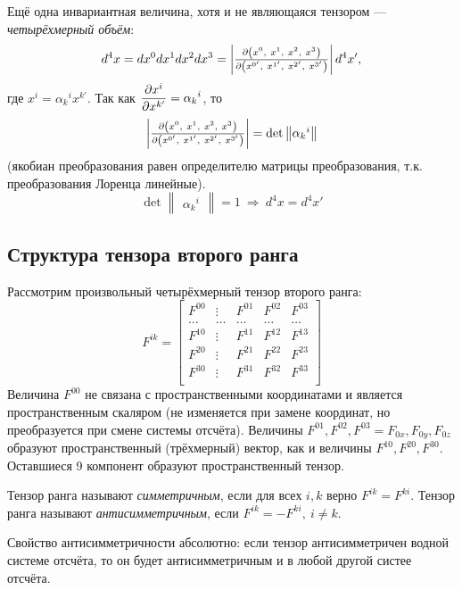     Ещё одна инвариантная величина, хотя и не являющаяся тензором --- \textit{четырёхмерный объём}:
    \[
        d^4x = dx^0dx^1dx^2dx^3 = \begin{vmatrix}
            \pard{\brackets{x^0,\ x^1,\ x^2,\ x^3}}{\brackets{x^{0'},\ x^{1'},\ x^{2'},\ x^{3'}}}
        \end{vmatrix} d^4x',
    \]
    где $x^i = {\alpha_k}^i x^{k'}$. Так как $\displaystyle \frac{\partial x^i}{\partial x^{k'}} = {\alpha_k}^i$, то
    \[
        \begin{vmatrix}
            \pard{\brackets{x^0,\ x^1,\ x^2,\ x^3}}{\brackets{x^{0'},\ x^{1'},\ x^{2'},\ x^{3'}}}
        \end{vmatrix} = \det\begin{Vmatrix}
            {\alpha_k}^i
        \end{Vmatrix}
    \]
    (якобиан преобразования равен определителю матрицы преобразования, т.к. преобразования Лоренца линейные).
    \[
        \det\begin{Vmatrix}
            {\alpha_k}^i
        \end{Vmatrix} = 1 \: \Rightarrow \: d^4x = d^4x'
    \]

\subsection{Структура тензора второго ранга}
    Рассмотрим произвольный четырёхмерный тензор второго ранга:
    \[
        F^{ik} = 
        \begin{bmatrix}
            F^{00} & \vdots & F^{01} & F^{02} & F^{03} \\
            \dots & \dots & \dots & \dots & \dots \\
            F^{10} & \vdots & F^{11} & F^{12} & F^{13} \\
            F^{20} & \vdots & F^{21} & F^{22} & F^{23} \\
            F^{30} & \vdots & F^{31} & F^{32} & F^{33} \\
        \end{bmatrix}
    \]
    Величина $F^{00}$ не связана с пространственными координатами и является пространственным скаляром (не изменяется
    при замене координат, но преобразуется при смене системы отсчёта).
    Величины $F^{01}, F^{02}, F^{03} = F_{0x}, F_{0y}, F_{0z}$ образуют пространственный (трёхмерный) вектор, как и величины $F^{10}, F^{20}, F^{30}$.
    Оставшиеся 9 компонент образуют пространственный тензор.

    \begin{Def}
        Тензор  ранга называют \textit{симметричным}, если для всех $i, k$ верно $F^{ik} = F^{ki}$.
        Тензор  ранга называют \textit{антисимметричным}, если $F^{ik} = -F^{ki}, \: i \not= k$.
    \end{Def}
    \begin{prop}
        Свойство антисимметричности абсолютно: если тензор антисимметричен  водной системе отсчёта, то он будет антисимметричным и в любой другой
        систее отсчёта.
    \end{prop}

